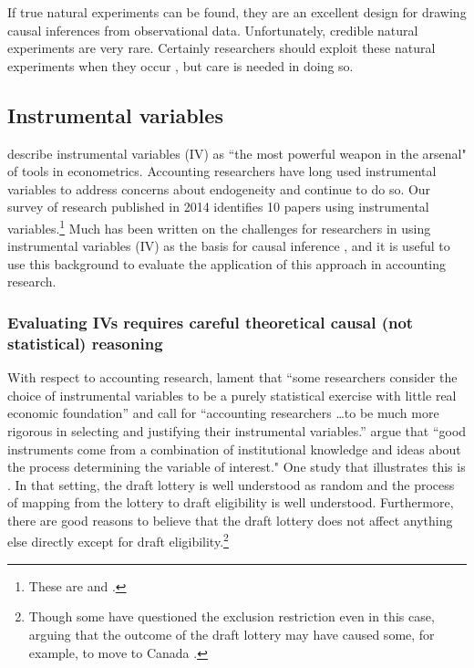 \documentclass[12pt,reqno,titlepage]{amsart}
\begin{document}
\begin{doublespace}
If true natural experiments can be found, they are an excellent design for drawing causal inferences from observational data. 
Unfortunately, credible natural experiments are very rare.
Certainly researchers should exploit these natural experiments when they occur \citep[e.g.,][]{Michels:2015aa,Li:2015he}, but care is needed in doing so.

\subsection{Instrumental variables}
\citet[p.114]{Angrist:2008vk} describe instrumental variables (IV) as ``the most powerful weapon in the arsenal" of tools in econometrics. 
Accounting researchers have long used instrumental variables to address concerns about endogeneity \citep{Larcker:2010fq,Lennox:2012it} and continue to do so.
Our survey of research published in 2014 identifies 10 papers using instrumental variables.\footnote{
These are \citet{Cannon:2014im,Cohen:2014jl,Kim:2014fm,Vermeer:2014bs,Fox:2014io,Guedhami:2013cj,Houston:2014hv,deFranco:2014ct,Erkens:2014hj} and \citet{Correia:2014fp}.}
Much has been written on the challenges for researchers in using instrumental variables (IV) as the basis for causal inference \citep[e.g.,][]{Roberts:2013cz}, and it is useful to use this background to evaluate the application of this approach in accounting research. 

\subsubsection{Evaluating IVs requires careful theoretical causal (not statistical) reasoning}

With respect to accounting research, \citet{Larcker:2010fq} lament that ``some researchers consider the choice of instrumental variables to be a purely statistical exercise with little real economic foundation'' and call for 
``accounting researchers \dots to be much more rigorous in selecting and justifying their instrumental variables.'' 
\citet[p.117]{Angrist:2008vk} argue that ``good instruments come from a combination of institutional knowledge and ideas about the process determining the variable of interest."
One study that illustrates this is \citet{Angrist:1990dk}.
In that setting, the draft lottery is well understood as random and the process of mapping from the lottery to draft eligibility is well understood.
Furthermore, there are good reasons to believe that the draft lottery does not affect anything else directly except for draft eligibility.\footnote{Though some have questioned the exclusion restriction even in this case, arguing that the outcome of the draft lottery may have caused some, for example, to move to Canada \citep[see][]{Imbens:2015aa}.}


\end{doublespace}
\end{document}

